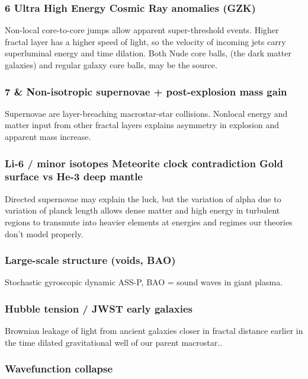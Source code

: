 \documentclass[11pt,a4paper]{article}
\begin{document}
\subsubsection{
6 Ultra High Energy Cosmic Ray anomalies (GZK) 
}
Non-local core-to-core jumps allow apparent super-threshold events. Higher fractal layer has a higher speed of light, so the velocity of incoming jets carry superluminal energy and time dilation. Both Nude core balls, (the dark matter galaxies) and regular galaxy core balls, may be the source.   \\ \hline


\subsubsection{
7 & Non-isotropic supernovae + post-explosion mass gain 
}
Supernovae are layer-breaching macrostar-star collisions. Nonlocal energy and matter input from other fractal layers explains asymmetry in explosion and apparent mass increase. \\ \hline

\subsubsection{
Li-6 / minor isotopes 
Meteorite clock contradiction 
Gold surface vs He-3 deep mantle
}
Directed supernovae may explain the luck, but the variation of alpha due to variation of planck length allows dense matter and high energy in turbulent regions to transmute into heavier elements at energies and regimes our theories don't model properly.

\subsubsection{
Large-scale structure (voids, BAO)
}
Stochastic gyroscopic dynamic ASS-P, BAO = sound waves in giant plasma.


\subsubsection{
Hubble tension / JWST early galaxies
}
Brownian leakage of light from ancient galaxies closer in fractal distance earlier in the time dilated gravitational well of our parent macrostar..

\subsubsection{
 Wavefunction collapse 
 }
\end{document}
